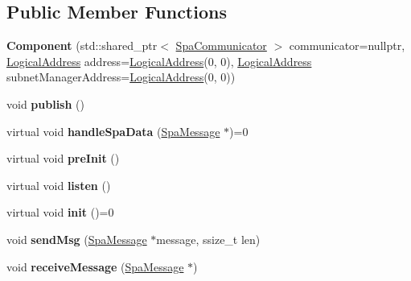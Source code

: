 \subsection*{Public Member Functions}
\begin{DoxyCompactItemize}
\item 
\mbox{\label{classComponent_a83f43d60a90000cfd63aca351ba648c4}} 
{\bfseries Component} (std\+::shared\+\_\+ptr$<$ \hyperlink{classSpaCommunicator}{Spa\+Communicator} $>$ communicator=nullptr, \hyperlink{structLogicalAddress}{Logical\+Address} address=\hyperlink{structLogicalAddress}{Logical\+Address}(0, 0), \hyperlink{structLogicalAddress}{Logical\+Address} subnet\+Manager\+Address=\hyperlink{structLogicalAddress}{Logical\+Address}(0, 0))
\item 
\mbox{\label{classComponent_a22b96395923537ce1a56692fdd971749}} 
void {\bfseries publish} ()
\item 
\mbox{\label{classComponent_a0f71f7a7ff6c0e7cd28692b6890a0058}} 
virtual void {\bfseries handle\+Spa\+Data} (\hyperlink{structSpaMessage}{Spa\+Message} $\ast$)=0
\item 
\mbox{\label{classComponent_a9e6d270061f52a3b42e9d2b0fd8f65c2}} 
virtual void {\bfseries pre\+Init} ()
\item 
\mbox{\label{classComponent_a2bbe062eb418a541fd0cfbcfdf3f55b0}} 
virtual void {\bfseries listen} ()
\item 
\mbox{\label{classComponent_a56baf8afdea3366554b3c7b13fd6e3f7}} 
virtual void {\bfseries init} ()=0
\item 
\mbox{\label{classComponent_a4fe6afd53663b5c1d3b60977024bc86a}} 
void {\bfseries send\+Msg} (\hyperlink{structSpaMessage}{Spa\+Message} $\ast$message, ssize\+\_\+t len)
\item 
\mbox{\label{classComponent_a3142ee952db05b1352f539d446f63934}} 
void {\bfseries receive\+Message} (\hyperlink{structSpaMessage}{Spa\+Message} $\ast$)
\item 
\mbox{\label{classComponent_af387d0bc27df38fc6c797d6d3329697a}} 

\end{DoxyCompactItemize}
